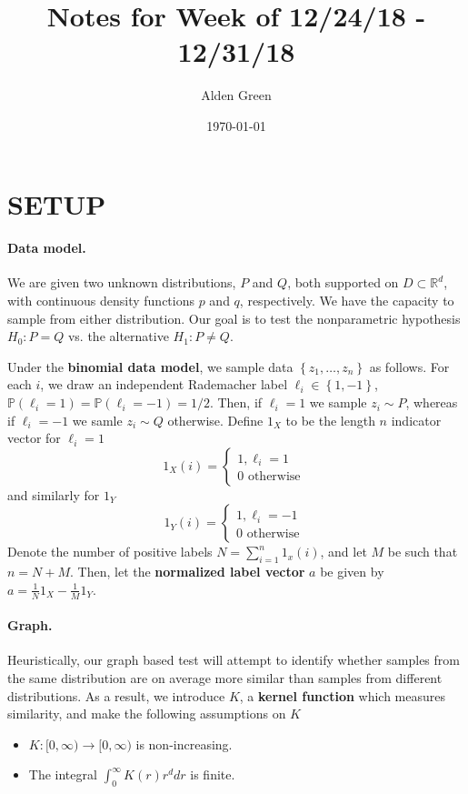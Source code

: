 \documentclass{article}
\newcommand{\Reals}{\mathbb{R}}
\newcommand{\set}[1]{\left\{#1\right\}}
\newcommand{\Rd}{\Reals^d}
\theoremstyle{alden}
\theoremstyle{aldenthm}
\theoremstyle{remark}
\begin{document}
	
\title{Notes for Week of 12/24/18 - 12/31/18}
\author{Alden Green}
\date{\today}
\maketitle

\section{SETUP}
\paragraph{Data model.}

We are given two unknown distributions, $P$ and $Q$, both supported on $D \subset \Rd$, with continuous density functions $p$ and $q$, respectively. We have the capacity to sample from either distribution. Our goal is to test the nonparametric hypothesis $H_0: P = Q$ vs. the alternative $H_1: P \neq Q$. 

Under the \textbf{binomial data model}, we sample data $\set{z_1, \ldots, z_n}$ as follows. For each $i$, we draw an independent Rademacher label $\ell_i \in \set{1, -1}$, $\mathbb{P}(\ell_i = 1) = \mathbb{P}(\ell_i = -1) = 1/2$. Then, if $\ell_i = 1$ we sample $z_i \sim P$, whereas if $\ell_i = -1$ we samle $z_i \sim Q$ otherwise. Define $1_X$ to be the length $n$ indicator vector for $\ell_i = 1$
\begin{equation*}
1_X(i) = 
\begin{cases}
1, \ell_i = 1\\
0 \text{ otherwise } 
\end{cases}
\end{equation*}
and similarly for $1_Y$
\begin{equation*}
1_Y(i) = 
\begin{cases}
1, \ell_i= -1 \\
0 \text{ otherwise } 
\end{cases}
\end{equation*}
Denote the number of positive labels $N = \sum_{i = 1}^{n} 1_x(i)$, and let $M$ be such that $n = N + M$. Then, let the \textbf{normalized label vector} $a$ be given by $a = \frac{1}{N}1_X - \frac{1}{M} 1_Y$. 

\paragraph{Graph.}

Heuristically, our graph based test will attempt to identify whether samples from the same distribution are on average more similar than samples from different distributions. As a result, we introduce $K$, a \textbf{kernel function} which measures similarity, and make the following assumptions on $K$
\begin{itemize}
	\item $K: [0,\infty) \to [0,\infty)$ is non-increasing.
	\item The integral $\int_{0}^{\infty} K(r) r^d dr$ is finite.
\end{itemize}
\end{document}
